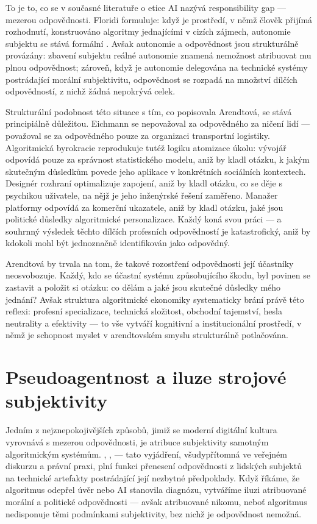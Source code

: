 To je to, co se v současné literatuře o etice AI nazývá responsibility gap — mezerou odpovědnosti. Floridi formuluje: když je prostředí, v němž člověk přijímá rozhodnutí, konstruováno algoritmy jednajícími v cizích zájmech, autonomie subjektu se stává formální \parencite{Floridi23}. Avšak autonomie a odpovědnost jsou strukturálně provázány: zbavení subjektu reálné autonomie znamená nemožnost atribuovat mu plnou odpovědnost; zároveň, když je autonomie delegována na technické systémy postrádající morální subjektivitu, odpovědnost se rozpadá na množství dílčích odpovědností, z nichž žádná nepokrývá celek.

Strukturální podobnost této situace s tím, co popisovala Arendtová, se stává principiálně důležitou. Eichmann se nepovažoval za odpovědného za ničení lidí — považoval se za odpovědného pouze za organizaci transportní logistiky. Algoritmická byrokracie reprodukuje tutéž logiku atomizace úkolu: vývojář odpovídá pouze za správnost statistického modelu, aniž by kladl otázku, k jakým skutečným důsledkům povede jeho aplikace v konkrétních sociálních kontextech. Designér rozhraní optimalizuje zapojení, aniž by kladl otázku, co se děje s psychikou uživatele, na nějž je jeho inženýrské řešení zaměřeno. Manažer platformy odpovídá za komerční ukazatele, aniž by kladl otázku, jaké jsou politické důsledky algoritmické personalizace. Každý koná svou práci — a souhrnný výsledek těchto dílčích profesních odpovědností je katastrofický, aniž by kdokoli mohl být jednoznačně identifikován jako odpovědný.

Arendtová by trvala na tom, že takové rozostření odpovědnosti její účastníky neosvobozuje. Každý, kdo se účastní systému způsobujícího škodu, byl povinen se zastavit a položit si otázku: co dělám a jaké jsou skutečné důsledky mého jednání? Avšak struktura algoritmické ekonomiky systematicky brání právě této reflexi: profesní specializace, technická složitost, obchodní tajemství, hesla neutrality a efektivity — to vše vytváří kognitivní a institucionální prostředí, v němž je schopnost myslet v arendtovském smyslu strukturálně potlačována.

\section{Pseudoagentnost a iluze strojové subjektivity}
Jedním z nejznepokojivějších způsobů, jimiž se moderní digitální kultura vyrovnává s mezerou odpovědnosti, je atribuce subjektivity samotným algoritmickým systémům. , ,  — tato vyjádření, všudypřítomná ve veřejném diskurzu a právní praxi, plní funkci přenesení odpovědnosti z lidských subjektů na technické artefakty postrádající její nezbytné předpoklady. Když říkáme, že algoritmus odepřel úvěr nebo AI stanovila diagnózu, vytváříme iluzi atribuované morální a politické odpovědnosti — avšak atribuované nikomu, neboť algoritmus nedisponuje těmi podmínkami subjektivity, bez nichž je odpovědnost nemožná.

